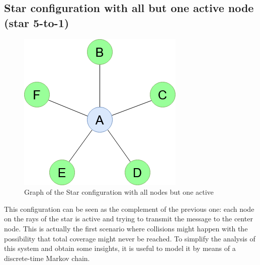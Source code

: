 \subsection{Star configuration with all but one active node (star 5-to-1)}
\label{ssec:star2}
\begin{figure}[H]
    \begin{center}
        \includegraphics[scale=0.5]{img/star_graph2.png}
        \caption{Graph of the Star configuration with all nodes but one active}
        \label{fig:star5to1}
    \end{center}
\end{figure}
This configuration can be seen as the complement of the previous one: each node
on the rays of the star is active and trying to transmit the message to the
center node. This is actually the first scenario where collisions might happen
with the possibility that total coverage might never be reached. To simplify the
analysis of this system and obtain some insights, it is useful to model it by
means of a discrete-time Markov chain.
